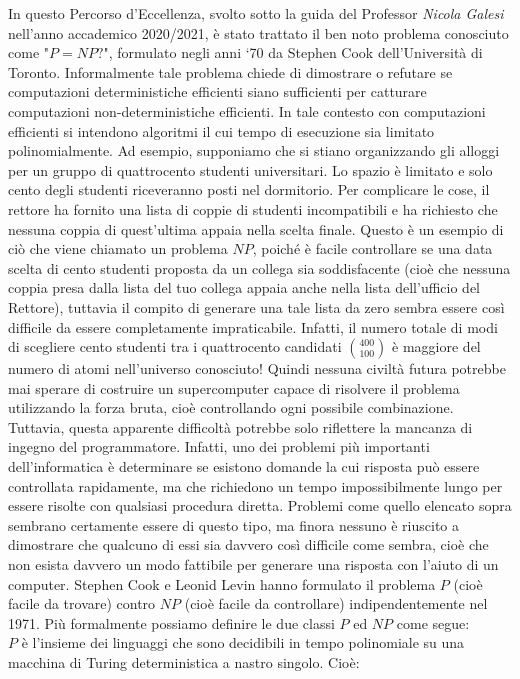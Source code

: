 \documentclass[it]{article}
\begin{document}
In questo Percorso d’Eccellenza, svolto sotto la guida del Professor \emph{Nicola Galesi} nell'anno accademico 2020/2021, è stato trattato il ben noto problema conosciuto come "$P = NP?$", formulato negli anni ‘70 da Stephen Cook dell’Università di Toronto. Informalmente tale problema chiede di dimostrare o refutare se computazioni deterministiche efficienti siano sufficienti per catturare computazioni non-deterministiche efficienti. In tale contesto con computazioni efficienti si intendono algoritmi il cui tempo di esecuzione sia limitato polinomialmente.
Ad esempio, supponiamo che si stiano organizzando gli alloggi per un gruppo di quattrocento studenti universitari. Lo spazio è limitato e solo cento degli studenti riceveranno posti nel dormitorio. Per complicare le cose, il rettore ha fornito una lista di coppie di studenti incompatibili e ha richiesto che nessuna coppia di quest'ultima appaia nella scelta finale. Questo è un esempio di ciò che viene chiamato un problema $ {\displaystyle NP} $, poiché è facile controllare se una data scelta di cento studenti proposta da un collega sia soddisfacente (cioè che nessuna coppia presa dalla lista del tuo collega appaia anche nella lista dell'ufficio del Rettore), tuttavia il compito di generare una tale lista da zero sembra essere così difficile da essere completamente impraticabile. Infatti, il numero totale di modi di scegliere cento studenti tra i quattrocento candidati $\binom{400}{100}$ è maggiore del numero di atomi nell'universo conosciuto! Quindi nessuna civiltà futura potrebbe mai sperare di costruire un supercomputer capace di risolvere il problema utilizzando la forza bruta, cioè controllando ogni possibile combinazione. Tuttavia, questa apparente difficoltà potrebbe solo riflettere la mancanza di ingegno del programmatore. Infatti, uno dei problemi più importanti dell'informatica è determinare se esistono domande la cui risposta può essere controllata rapidamente, ma che richiedono un tempo impossibilmente lungo per essere risolte con qualsiasi procedura diretta. Problemi come quello elencato sopra sembrano certamente essere di questo tipo, ma finora nessuno è riuscito a dimostrare che qualcuno di essi sia davvero così difficile come sembra, cioè che non esista davvero un modo fattibile per generare una risposta con l'aiuto di un computer. Stephen Cook e Leonid Levin hanno formulato il problema $ {\displaystyle P} $ (cioè facile da trovare) contro $ {\displaystyle NP} $ (cioè facile da controllare) indipendentemente nel 1971. 
Più formalmente possiamo definire le due classi $ {\displaystyle P} $ ed $ {\displaystyle NP} $ come segue:\\
$ {\displaystyle P} $ è l'insieme dei linguaggi che sono decidibili in tempo polinomiale su una macchina di Turing deterministica a nastro singolo. Cioè: 
	
\end{document}
